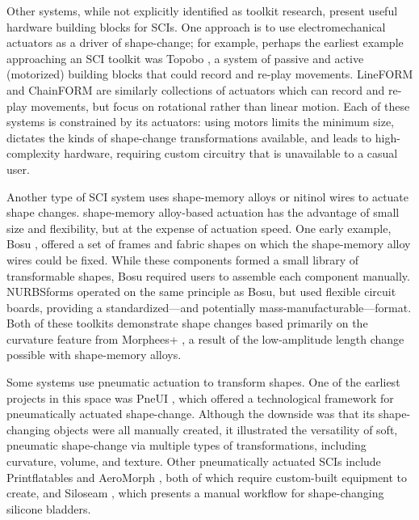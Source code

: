       Other systems, while not explicitly identified as toolkit research,
      present useful hardware building blocks for SCIs. One approach is to use
      electromechanical actuators as a driver of shape-change; for example,
      perhaps the earliest example approaching an SCI toolkit was Topobo
      \cite{Raffle:2004jj}, a system of passive and active (motorized) building
      blocks that could record and re-play movements. LineFORM
      \cite{10.1145/2807442.2807452} and ChainFORM \cite{nakagaki2016chainform}
      are similarly collections of actuators which can record and re-play
      movements, but focus on rotational rather than linear motion. Each of
      these systems is constrained by its actuators: using motors limits the
      minimum size, dictates the kinds of shape-change transformations
      available, and leads to high-complexity hardware, requiring custom
      circuitry that is unavailable to a casual user.
      
      Another type of SCI system uses shape-memory alloys or nitinol wires to
      actuate shape changes. shape-memory alloy-based actuation has the
      advantage of small size and flexibility, but at the expense of actuation
      speed. One early example, Bosu \cite{10.1145/1858171.1858205}, offered a
      set of frames and fabric shapes on which the shape-memory alloy wires
      could be fixed. While these components formed a small library of
      transformable shapes, Bosu required users to assemble each component
      manually.  NURBSforms \cite{10.1145/3374920.3374927} operated on the same
      principle as Bosu, but used flexible circuit boards, providing a
      standardized---and potentially mass-manufacturable---format. Both of these
      toolkits demonstrate shape changes based primarily on the curvature
      feature from Morphees+ \cite{10.1145/3173574.3174193}, a result of the
      low-amplitude length change possible with shape-memory alloys.
      
      Some systems use pneumatic actuation to transform shapes. One of the
      earliest projects in this space was PneUI \cite{Yao:2013bg}, which offered
      a technological framework for pneumatically actuated shape-change.
      Although the downside was that its shape-changing objects were all
      manually created, it illustrated the versatility of soft, pneumatic
      shape-change via multiple types of transformations, including curvature,
      volume, and texture. Other pneumatically actuated SCIs include
      Printflatables \cite{10.1145/3025453.3025898} and AeroMorph
      \cite{10.1145/2984511.2984520}, both of which require custom-built
      equipment to create, and Siloseam \cite{10.1145/3357236.3395473}, which
      presents a manual workflow for shape-changing silicone bladders.
      
